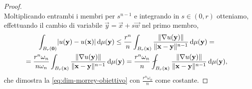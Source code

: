 \begin{proof}
\begin{equation}
    \end{equation}
    Moltiplicando entrambi i membri per $s^{n-1}$ e integrando in $s\in(0,r)$ otteniamo, effettuando il cambio di variabile $\vec y=\vec x+s\vec w$ nel primo membro,
    \begin{multline}
        \int_{B_r(\vec 0)}\abs{u(\vec y)-u(\vec x)}\,\dd\mu(\vec y)\le
        \frac{r^n}{n}\int_{B_r(\vec x)}\frac{\norm{\grad u(\vec y)}}{\norm{\vec x-\vec y}^{n-1}}\,\dd\mu(\vec y)=\\=
        \frac{r^n\omega_n}{n\omega_n}\int_{B_r(\vec x)}\frac{\norm{\grad u(\vec y)}}{\norm{\vec x-\vec y}^{n-1}}\,\dd\mu(\vec y)=
        \frac{r^n\omega_n}{n}\avint_{B_r(\vec x)}\frac{\norm{\grad u(\vec y)}}{\norm{\vec x-\vec y}^{n-1}}\,\dd\mu(\vec y),
    \end{multline}
    che dimostra la \eqref{eq:dim-morrey-obiettivo} con $\frac{r^n\omega_n}{n}$ come costante.


\end{proof}
